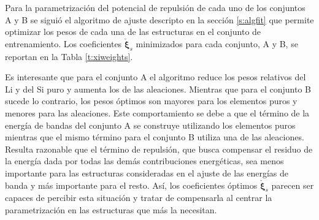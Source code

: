 Para la parametrización del potencial de repulsión de cada uno de los conjuntos 
A y B se siguió el algoritmo de ajuste descripto en la sección \ref{s:algfit}
que permite optimizar los pesos de cada una de las estructuras en el conjunto de 
entrenamiento. Los coeficientes $\check{\boldsymbol{\xi}}_s$ minimizados para cada
conjunto, A y B, se reportan en la Tabla \ref{t:xiweights}.
\begin{table}[b]
    \centering
    \caption{Pesos óptimos, $\check{\boldsymbol{\xi}}_s$, de cada conjunto.}
    \setlength\extrarowheight{2pt}
    \label{t:xiweights}
\end{table}
Es interesante que para el conjunto A el algoritmo reduce los pesos relativos del 
Li y del Si puro y aumenta los de las aleaciones. Mientras que para el conjunto 
B sucede lo contrario, los pesos óptimos son mayores para los elementos puros y
menores para las aleaciones. Este comportamiento se debe a que el término de la 
energía de bandas del conjunto A se construye utilizando los elementos puros 
mientras que el mismo término para el conjunto B utiliza una de las aleaciones. 
Resulta razonable que el término de repulsión, que busca compensar el residuo de la 
energía dada por todas las demás contribuciones energéticas, sea menos importante 
para las estructuras consideradas en el ajuste de las energías de banda y más 
importante para el resto. Así, los coeficientes óptimos $\check{\boldsymbol{\xi}}_s$ 
parecen ser capaces de percibir esta situación y tratar de compensarla al centrar 
la parametrización en las estructuras que más la necesitan.

